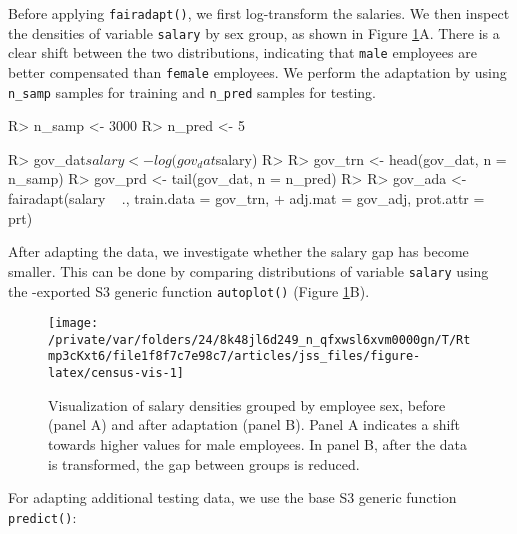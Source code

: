 \documentclass[
  nojss]{jss}
\begin{document}
Before applying \texttt{fairadapt()}, we first log-transform the
salaries. We then inspect the densities of variable \texttt{salary} by
sex group, as shown in Figure \ref{fig:census-vis}A. There is a clear
shift between the two distributions, indicating that \texttt{male}
employees are better compensated than \texttt{female} employees. We
perform the adaptation by using \texttt{n\_samp} samples for training
and \texttt{n\_pred} samples for testing.

\begin{CodeChunk}
\begin{CodeInput}
R> n_samp <- 3000
R> n_pred <- 5
\end{CodeInput}
\end{CodeChunk}

\begin{CodeChunk}
\begin{CodeInput}
R> gov_dat$salary <- log(gov_dat$salary)
R> 
R> gov_trn <- head(gov_dat, n = n_samp)
R> gov_prd <- tail(gov_dat, n = n_pred)
R> 
R> gov_ada <- fairadapt(salary ~ ., train.data = gov_trn,
+                      adj.mat = gov_adj, prot.attr = prt)
\end{CodeInput}
\end{CodeChunk}

After adapting the data, we investigate whether the salary gap has
become smaller. This can be done by comparing distributions of variable
\texttt{salary} using the -exported S3 generic function
\texttt{autoplot()} (Figure \ref{fig:census-vis}B).

\begin{CodeChunk}
\begin{figure}

{\centering \texttt{[image: /private/var/folders/24/8k48jl6d249\_n\_qfxwsl6xvm0000gn/T/Rtmp3cKxt6/file1f8f7c7e98c7/articles/jss\_files/figure-latex/census-vis-1]} 

}

\caption[Visualization of salary densities grouped by employee sex, before (panel A) and after adaptation (panel B)]{Visualization of salary densities grouped by employee sex, before (panel A) and after adaptation (panel B). Panel A indicates a shift towards higher values for male employees. In panel B, after the data is transformed, the gap between groups is reduced.}\label{fig:census-vis}
\end{figure}
\end{CodeChunk}

For adapting additional testing data, we use the base  S3
generic function \texttt{predict()}:
\end{document}
